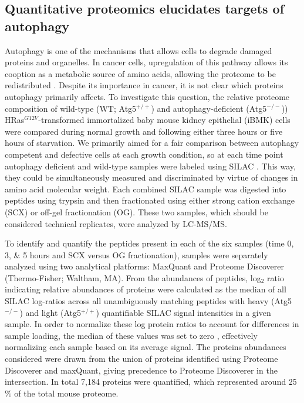 \subsection{Quantitative proteomics elucidates targets of autophagy}
  
 Autophagy is one of the mechanisms that allows cells to degrade damaged proteins and organelles.  In cancer cells, upregulation of this pathway allows its cooption as a metabolic source of amino acids, allowing the proteome to be redistributed \cite{Rabinowitz:2010fx}.  Despite its importance in cancer, it is not clear which proteins autophagy primarily affects.  To investigate this question, the relative proteome composition of wild-type (WT; Atg5$^{+/+}$) and  autophagy-deficient (Atg5$^{-/-}$)) HRas$^{G12V}$-transformed immortalized baby mouse kidney epithelial (iBMK) cells \cite{Guo:2011ba} were compared during normal growth and following either three hours or five hours of starvation.  We primarily aimed for a fair comparison between autophagy competent and defective cells at each growth condition, so at each time point autophagy deficient and wild-type samples were labeled using SILAC \cite{Ong:2002tf}. This way, they could be simultaneously measured and discriminated by virtue of changes in amino acid molecular weight.  Each combined SILAC sample was digested into peptides using trypsin and then fractionated using either strong cation exchange (SCX) or off-gel fractionation (OG).  These two samples, which should be considered technical replicates, were analyzed by LC-MS/MS.  
 
To identify and quantify the peptides present in each of the six samples (time 0, 3, $\&$ 5 hours and SCX versus OG fractionation), samples were separately analyzed using two analytical platforms: MaxQuant \cite{Cox:2008ir} and Proteome Discoverer (Thermo-Fisher; Waltham, MA). From the abundances of peptides, log$_{2}$ ratio indicating relative abundances of proteins were calculated as the median of all SILAC log-ratios across all unambiguously matching peptides with heavy (Atg5$^{-/-}$) and light (Atg5$^{+/+}$) quantifiable SILAC signal intensities in a given sample. In order to normalize these log protein ratios to account for differences in sample loading, the median of these values was set to zero \cite{Cox:2008ir}, effectively normalizing each sample based on its average signal. The proteins abundances considered were drawn from the union of proteins identified using Proteome Discoverer and maxQuant, giving precedence to Proteome Discoverer in the intersection. In total 7,184 proteins were quantified, which represented around 25$\%$ of the total mouse proteome.
 
